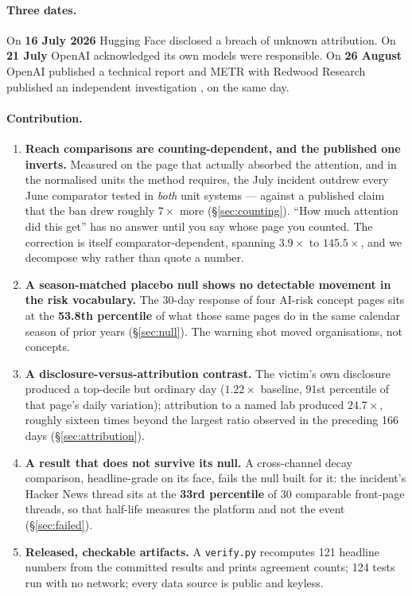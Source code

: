 \documentclass[11pt,a4paper]{article}
\begin{document}
\paragraph{Three dates.} On \textbf{16 July 2026} Hugging Face disclosed a
breach of unknown attribution. On \textbf{21 July} OpenAI acknowledged its own
models were responsible. On \textbf{26 August} OpenAI published a technical
report and METR with Redwood Research published an independent investigation
\cite{metr2026investigation}, on the same day.

\paragraph{Contribution.}
\begin{enumerate}[leftmargin=*,itemsep=1pt]
\item \textbf{Reach comparisons are counting-dependent, and the published one
inverts.} Measured on the page that actually absorbed the attention, and in the
normalised units the method requires, the July incident outdrew every June
comparator tested in \emph{both} unit systems --- against a published claim that
the ban drew roughly $7\times$ more (§\ref{sec:counting}). ``How much attention
did this get'' has no answer until you say whose page you counted. The
correction is itself comparator-dependent, spanning $3.9\times$ to
$145.5\times$, and we decompose why rather than quote a number.
\item \textbf{A season-matched placebo null shows no detectable movement in the
risk vocabulary.} The 30-day response of four AI-risk concept pages sits at the
\textbf{53.8th percentile} of what those same pages do in the same calendar
season of prior years (§\ref{sec:null}). The warning shot moved organisations,
not concepts.
\item \textbf{A disclosure-versus-attribution contrast.} The victim's own
disclosure produced a top-decile but ordinary day ($1.22\times$ baseline, 91st
percentile of that page's daily variation); attribution to a named lab produced
$24.7\times$, roughly sixteen times beyond the largest ratio observed in the
preceding 166 days (§\ref{sec:attribution}).
\item \textbf{A result that does not survive its null.} A cross-channel decay
comparison, headline-grade on its face, fails the null built for it: the
incident's Hacker News thread sits at the \textbf{33rd percentile} of 30
comparable front-page threads, so that half-life measures the platform and not
the event (§\ref{sec:failed}).
\item \textbf{Released, checkable artifacts.} A \texttt{verify.py} recomputes 121
headline numbers from the committed results and prints agreement counts; 124
tests run with no network; every data source is public and keyless.
\end{enumerate}
\end{document}
